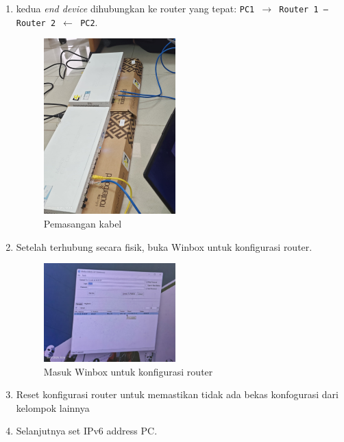 \begin{enumerate}
	\item  kedua \textit{end device} dihubungkan ke router yang tepat: \texttt{PC1 $\rightarrow$ Router\,1 — Router\,2 $\leftarrow$ PC2}.

\begin{figure}[H]
    \centering
    \includegraphics[width=0.48\textwidth]{img/Pasang.jpeg}
    \caption{Pemasangan kabel}
    \label{fig:pasang}
\end{figure}



\item Setelah terhubung secara fisik, buka Winbox untuk konfigurasi router.

\begin{figure}[H]
    \centering
    \includegraphics[width=0.48\textwidth]{img/winbox.jpeg}
    \caption{Masuk Winbox untuk konfigurasi router}
    \label{fig:winbox}
\end{figure}

\item Reset konfigurasi router untuk memastikan tidak ada bekas konfogurasi dari kelompok lainnya

\item Selanjutnya set IPv6 address PC.


\end{enumerate}
